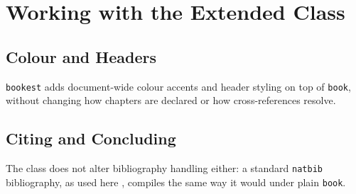 \documentclass[11pt]{bookest}
\begin{document}
\chapter{Working with the Extended Class}

\section{Colour and Headers}

\texttt{bookest} adds document-wide colour accents and header styling on top
of \texttt{book}, without changing how chapters are declared or how
cross-references resolve.

\section{Citing and Concluding}

The class does not alter bibliography handling either: a standard
\texttt{natbib} bibliography, as used here \citep{knuth1984texbook}, compiles
the same way it would under plain \texttt{book}.



\end{document}
